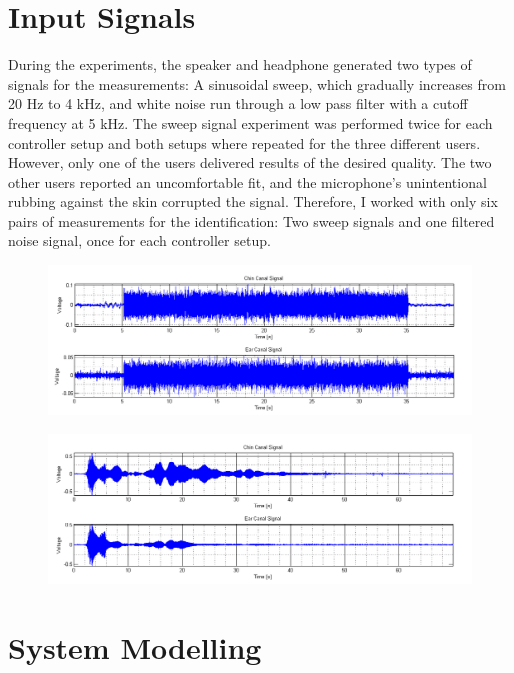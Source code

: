 \section{Input Signals}

During the experiments, the speaker and headphone generated two types of signals for the measurements: A sinusoidal sweep, which gradually increases from 20 Hz to 4 kHz, and white noise run through a low pass filter with a cutoff frequency at 5 kHz. The sweep signal experiment was performed twice for each controller setup and both setups where repeated for the three different users. However, only one of the users delivered results of the desired quality. The two other users reported an uncomfortable fit, and the microphone's unintentional rubbing against the skin corrupted the signal. Therefore, I worked with only six pairs of measurements for the identification: Two sweep signals and one filtered noise signal, once for each controller setup.

\begin{figure}[h]
\centering
\includegraphics[width=1.0\textwidth]{pics/Noise}
\caption{}
\label{pic:}
\end{figure}

\begin{figure}[h]
\centering
\includegraphics[width=1.0\textwidth]{pics/Sweep}
\caption{}
\label{pic:}
\end{figure}

\section{System Modelling}

